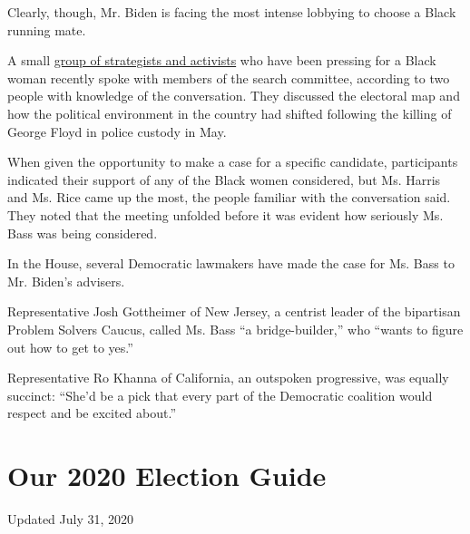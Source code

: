 Clearly, though, Mr. Biden is facing the most intense lobbying to choose
a Black running mate.

A small
\href{https://www.nytimes.com/2020/06/10/us/politics/joe-biden-black-vice-president.html}{group
of strategists and activists} who have been pressing for a Black woman
recently spoke with members of the search committee, according to two
people with knowledge of the conversation. They discussed the electoral
map and how the political environment in the country had shifted
following the killing of George Floyd in police custody in May.

When given the opportunity to make a case for a specific candidate,
participants indicated their support of any of the Black women
considered, but Ms. Harris and Ms. Rice came up the most, the people
familiar with the conversation said. They noted that the meeting
unfolded before it was evident how seriously Ms. Bass was being
considered.

In the House, several Democratic lawmakers have made the case for Ms.
Bass to Mr. Biden's advisers.

Representative Josh Gottheimer of New Jersey, a centrist leader of the
bipartisan Problem Solvers Caucus, called Ms. Bass ``a bridge-builder,''
who ``wants to figure out how to get to yes.''

Representative Ro Khanna of California, an outspoken progressive, was
equally succinct: ``She'd be a pick that every part of the Democratic
coalition would respect and be excited about.''

\hypertarget{our-2020-election-guide}{%
\section{Our 2020 Election Guide}\label{our-2020-election-guide}}

Updated July 31, 2020

